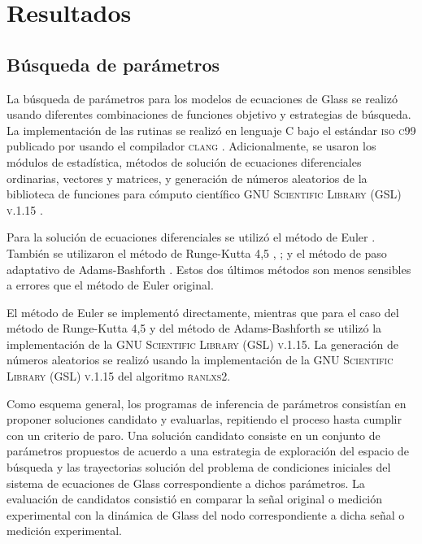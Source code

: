 \chapter{Resultados}\label{ch:resultados}
\section{Búsqueda de parámetros}

La búsqueda de parámetros para los modelos de ecuaciones de Glass se realizó usando diferentes combinaciones de funciones objetivo y estrategias de búsqueda. La implementación de las rutinas se realizó en lenguaje C \citep{Kernighan1988} bajo el estándar \textsc{iso c99} publicado por \citet{c99} usando el compilador \textsc{clang} \citep{clang}. Adicionalmente, se usaron los módulos de estadística, métodos de solución de ecuaciones diferenciales ordinarias, vectores y matrices, y generación de números aleatorios de la biblioteca de funciones para cómputo científico \textsc{GNU Scientific Library (GSL) v.1.15} \citep{gslManual}.

Para la solución de ecuaciones diferenciales se utilizó el método de Euler \citeauthor{numrecipesc} \citep{numrecipesc}. También se utilizaron el método de Runge-Kutta 4,5 \citeauthor{numrecipesc} \citep{numrecipesc}, \citep{gslManual}; y el método de paso adaptativo de Adams-Bashforth \citep{gslManual}. Estos dos últimos métodos son menos sensibles a errores que el método de Euler original.

El método de Euler se implementó directamente, mientras que para el caso del método de Runge-Kutta 4,5 y del método de Adams-Bashforth se utilizó la implementación de la \textsc{GNU Scientific Library (GSL) v.1.15}. La generación de números aleatorios se realizó usando la implementación de la \textsc{GNU Scientific Library (GSL) v.1.15} del algoritmo \textsc{ranlxs2}.

Como esquema general, los programas de inferencia de parámetros consistían en proponer soluciones candidato y evaluarlas, repitiendo el proceso hasta cumplir con un criterio de paro. Una solución candidato consiste en un conjunto de parámetros propuestos de acuerdo a una estrategia de exploración del espacio de búsqueda y las trayectorias solución del problema de condiciones iniciales del sistema de ecuaciones de Glass correspondiente a dichos parámetros. La evaluación de candidatos consistió en comparar la señal original o medición experimental con la dinámica de Glass del nodo correspondiente a dicha señal o medición experimental.

